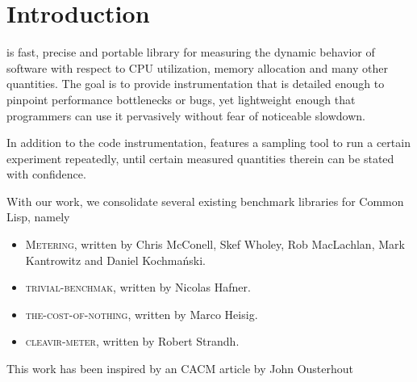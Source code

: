 \section{Introduction}

\sysname{} is fast, precise and portable library for measuring the dynamic
behavior of software with respect to CPU utilization, memory allocation and
many other quantities.  The goal is to provide instrumentation that is
detailed enough to pinpoint performance bottlenecks or bugs, yet
lightweight enough that programmers can use it pervasively without fear of
noticeable slowdown.

In addition to the code instrumentation, \sysname{} features a sampling
tool to run a certain experiment repeatedly, until certain measured
quantities therein can be stated with confidence.

With our work, we consolidate several existing benchmark libraries for
Common Lisp, namely

\begin{itemize}
\item \textsc{Metering}, written by Chris McConell, Skef Wholey, Rob
  MacLachlan, Mark Kantrowitz and Daniel Kochmański.

\item \textsc{trivial-benchmak}, written by Nicolas Hafner.

\item \textsc{the-cost-of-nothing}, written by Marco Heisig.

\item \textsc{cleavir-meter}, written by Robert Strandh.
\end{itemize}

This work has been inspired by an CACM article by John Ousterhout\cite{ousterhout-cacm}